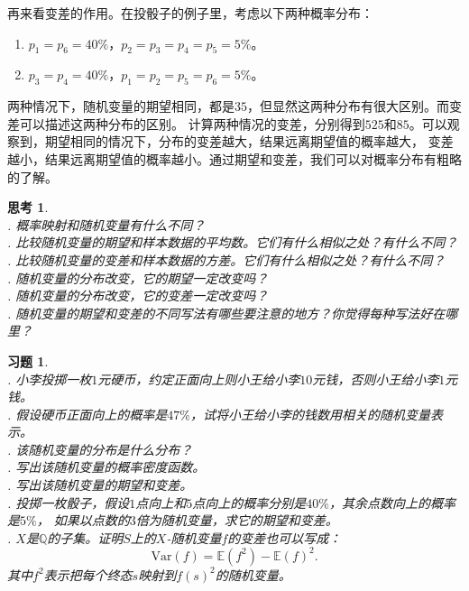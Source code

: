 \documentclass[12pt,UTF8]{ctexbook}
\newtheorem{sk}{思考}[section]
\newtheorem{xt}{习题}[section]
\begin{document}
再来看变差的作用。在投骰子的例子里，考虑以下两种概率分布：
\begin{enumerate}
    \item $p_1 = p_6 = 40\%$，$p_2 = p_3 = p_4 = p_5 = 5\%$。
    \item $p_3 = p_4 = 40\%$，$p_1 = p_2 = p_5 = p_6 = 5\%$。
\end{enumerate}
两种情况下，随机变量的期望相同，都是$35$，但显然这两种分布有很大区别。而变差可以描述这两种分布的区别。
计算两种情况的变差，分别得到$525$和$85$。可以观察到，期望相同的情况下，分布的变差越大，结果远离期望值的概率越大，
变差越小，结果远离期望值的概率越小。通过期望和变差，我们可以对概率分布有粗略的了解。

\begin{sk}
    \mbox{} \\
    . 概率映射和随机变量有什么不同？ \\
    . 比较随机变量的期望和样本数据的平均数。它们有什么相似之处？有什么不同？\\
    . 比较随机变量的变差和样本数据的方差。它们有什么相似之处？有什么不同？\\
    . 随机变量的分布改变，它的期望一定改变吗？\\
    . 随机变量的分布改变，它的变差一定改变吗？ \\
    . 随机变量的期望和变差的不同写法有哪些要注意的地方？你觉得每种写法好在哪里？   
\end{sk}

\begin{xt}
    \mbox{} \\
    . 小李投掷一枚$1$元硬币，约定正面向上则小王给小李$10$元钱，否则小王给小李$1$元钱。\\
    . 假设硬币正面向上的概率是$47\%$，试将小王给小李的钱数用相关的随机变量表示。\\
    . 该随机变量的分布是什么分布？    \\
    . 写出该随机变量的概率密度函数。\\
    . 写出该随机变量的期望和变差。\\
    . 投掷一枚骰子，假设$1$点向上和$5$点向上的概率分别是$40\%$，其余点数向上的概率是$5\%$，
    如果以点数的$3$倍为随机变量，求它的期望和变差。\\
    . $X$是$\mathbb{Q}$的子集。证明$S$上的$X$-随机变量$f$的变差也可以写成：
    $$ \mathrm{Var}(f)  = \mathbb{E}(f^2) - \mathbb{E}(f)^2.$$  
    \indent \hspace{1em}  其中$f^2$表示把每个终态$s$映射到$f(s)^2$的随机变量。
\end{xt}
\end{document}
